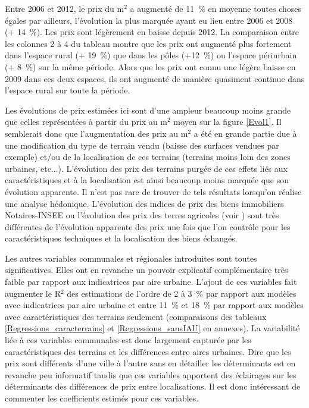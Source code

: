 \documentclass[10.5pt,a4paper]{article}
\begin{document}
{Entre 2006 et 2012, le prix du m$^2$ a augmenté de 11~\% en moyenne toutes choses égales par ailleurs, l'évolution la plus marquée ayant eu lieu entre 2006 et 2008 (+ 14~\%). Les prix sont légèrement en baisse depuis 2012. La comparaison entre les colonnes 2 à 4 du tableau montre que les prix ont augmenté plus fortement dans l'espace rural (+ 19~\%) que dans les pôles (+12~\%) ou l'espace périurbain (+ 8~\%) sur la même période. Alors que les prix ont connu une légère baisse en 2009 dans ces deux espaces, ils ont augmenté de manière quasiment continue dans l'espace rural sur toute la période. \par  

Les évolutions de prix estimées ici sont d'une ampleur beaucoup moins grande que celles représentées à partir du prix au m$^2$ moyen sur la figure \ref{Evol1}.  Il semblerait donc que l'augmentation des prix au m$^2$ a été en grande partie due à une modification du type de terrain vendu (baisse des surfaces vendues par exemple) et/ou de la localisation de ces terrains (terrains moins loin des zones urbaines, etc...). L'évolution des prix des terrains purgée de ces effets liés aux caractéristiques et à la localisation est ainsi beaucoup moins marquée que son évolution apparente. Il n'est pas rare de trouver de tels résultats lorsqu'on réalise une analyse hédonique. L'évolution des indices de prix des biens immobiliers Notaires-INSEE ou l'évolution des prix des terres agricoles (voir \cite{LefeRouq11}) sont très différentes de l'évolution apparente des prix une fois que l'on contrôle pour les caractéristiques techniques et la localisation des biens échangés.\par   

Les autres variables communales et régionales introduites sont toutes significatives. Elles ont en revanche un pouvoir explicatif complémentaire très faible par rapport aux indicatrices par aire urbaine. L'ajout de ces variables fait augmenter le R$^2$ des estimations de l'ordre de 2 à 3~\% par rapport aux modèles avec indicatrices par aire urbaine et entre 11~\% et 18~\% par rapport aux modèles avec caractéristiques des terrains seulement (comparaisons des tableaux \ref{Regressions_caracterrains} et \ref{Regressions_sansIAU} en annexes). La variabilité liée à ces variables communales est donc largement capturée par les caractéristiques des terrains et les différences entre aires urbaines. Dire que les prix sont différents d'une ville à l'autre sans en détailler les déterminants est en revanche peu informatif tandis que ces variables apportent des éclairages sur les déterminants des différences de prix entre localisations. Il est donc intéressant de commenter les coefficients estimés pour ces variables. \par  

}
\end{document}
